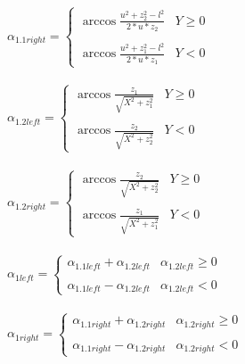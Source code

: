 \documentclass{article}
\begin{document}
    \paragraph{}
    $\alpha_{1.1right} = \left\{
    \begin{array}{ll}
    \arccos \frac{u^2 + z_2^2 - l^2}{2 * u * z_2} & Y \ge 0 \\ \\
    \arccos \frac{u^2 + z_1^2 - l^2}{2 * u * z_1} & Y < 0
    \end{array}
    \right. $ 

    \paragraph{}
    $\alpha_{1.2left} = \left\{
    \begin{array}{ll}
    \arccos \frac{z_1}{\sqrt{X^2 + z_1^2}} & Y \ge 0 \\ \\
    \arccos \frac{z_2}{\sqrt{X^2 + z_2^2}} & Y < 0
    \end{array}
    \right. $ 

    \paragraph{}
    $\alpha_{1.2right} = \left\{
    \begin{array}{ll}
    \arccos \frac{z_2}{\sqrt{X^2 + z_2^2}} & Y \ge 0 \\ \\
    \arccos \frac{z_1}{\sqrt{X^2 + z_1^2}} & Y < 0
    \end{array}
    \right. $ 

    \paragraph{}
    $\alpha_{1left} = \left\{
    \begin{array}{ll}
    \alpha_{1.1left} + \alpha_{1.2left} & \alpha_{1.2left} \ge 0 \\ \\
    \alpha_{1.1left} - \alpha_{1.2left} & \alpha_{1.2left} < 0
    \end{array}
    \right. $    

    \paragraph{}
    $\alpha_{1right} = \left\{
    \begin{array}{ll}
    \alpha_{1.1right} + \alpha_{1.2right} & \alpha_{1.2right} \ge 0 \\ \\
    \alpha_{1.1right} - \alpha_{1.2right} & \alpha_{1.2right} < 0
    \end{array}
    \right. $   
\end{document}
